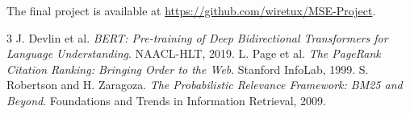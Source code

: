 \documentclass[12pt,a4paper]{article}
\begin{document}
The final project is available at \url{https://github.com/wiretux/MSE-Project}.

\begin{thebibliography}{3}\small
{} J. Devlin et al. \emph{BERT: Pre-training of Deep Bidirectional Transformers for Language Understanding}. NAACL-HLT, 2019.
 L. Page et al. \emph{The PageRank Citation Ranking: Bringing Order to the Web}. Stanford InfoLab, 1999.
 S. Robertson and H. Zaragoza. \emph{The Probabilistic Relevance Framework: BM25 and Beyond}. Foundations and Trends in Information Retrieval, 2009.
\end{thebibliography}
\end{document}
